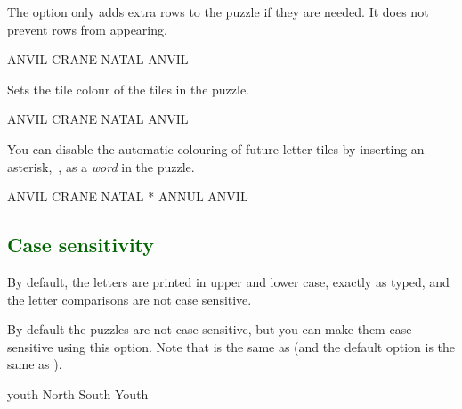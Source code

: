 \documentclass[svgnames]{report}
\newcommand\Section[1]{\subsection{\textcolor{DarkGreen}{#1}}}
\begin{document}
  The  option only adds extra rows to the puzzle if they are
  needed. It does not prevent rows from appearing.

  \begin{example}
    \begin{wordle}[rows=2]{ANVIL}
      CRANE
      NATAL
      ANVIL
    \end{wordle}
  \end{example}



  Sets the tile colour of the \textit{\empty} tiles in the puzzle.

  \begin{example}
    \begin{wordle}[rows=5, empty=AliceBlue]{ANVIL}
      CRANE
      NATAL
      ANVIL
    \end{wordle}
  \end{example}

  \option{*}

  You can disable the automatic colouring of future letter tiles by
  inserting an asterisk,~\option{*}, as a \textit{word} in the puzzle.

  \begin{example}
    \begin{wordle}{ANVIL}
      CRANE
      NATAL
      *
      ANNUL
      ANVIL
    \end{wordle}
  \end{example}


  \Section{Case sensitivity}

  By default, the letters are printed in upper and lower case, exactly
  as typed, and the letter comparisons are not case sensitive.


  By default the  puzzles are not case sensitive, but
  you can make them case sensitive using this option. Note that
   is the same as 
  (and the default option is the same as
  ).

  \begin{example}
    \begin{wordle}{youth}
      North
      South
      Youth
    \end{wordle}
  \end{example}
\end{document}
